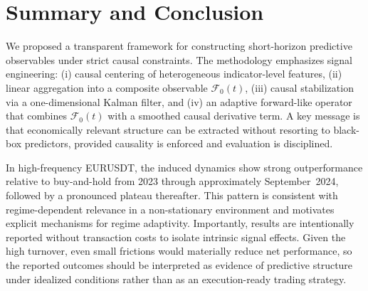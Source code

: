 \documentclass[final,5p,times,twocolumn]{elsarticle}
\begin{document}
\begin{table}[!t]
\centering
\caption{Incremental performance and activity metrics computed separately within each subperiod, with the cumulative return curve normalized to $V_0 = 1$ at the beginning of each regime. End equity $V$ denotes the final value.}
\label{tab:regime_metrics}
\end{table}


\section{Summary and Conclusion}
\label{sec:conclusion}

We proposed a transparent framework for constructing short-horizon predictive observables under strict causal constraints.
The methodology emphasizes signal engineering: (i) causal centering of heterogeneous indicator-level features, (ii) linear aggregation into a composite observable $\mathscr{F}_0(t)$, (iii) causal stabilization via a one-dimensional Kalman filter, and (iv) an adaptive forward-like operator that combines $\mathscr{F}_0(t)$ with a smoothed causal derivative term.
A key message is that economically relevant structure can be extracted without resorting to black-box predictors, provided causality is enforced and evaluation is disciplined.

In high-frequency EURUSDT, the induced dynamics show strong outperformance relative to buy-and-hold from 2023 through approximately September~2024, followed by a pronounced plateau thereafter.
This pattern is consistent with regime-dependent relevance in a non-stationary environment and motivates explicit mechanisms for regime adaptivity.
Importantly, results are intentionally reported without transaction costs to isolate intrinsic signal effects. Given the high turnover, even small frictions would materially reduce net performance, so the reported outcomes should be interpreted as evidence of predictive structure under idealized conditions rather than as an execution-ready trading strategy.
\end{document}
